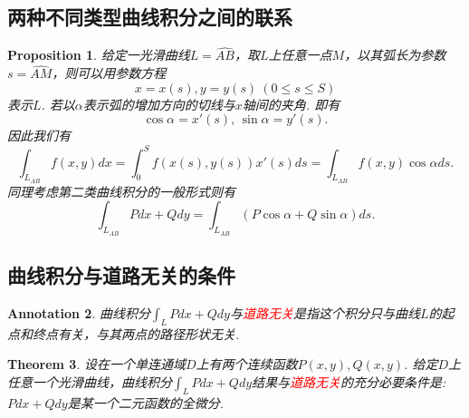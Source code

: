 \documentclass{article}
\newtheorem{theorem}{Theorem}[section]
\newtheorem{proposition}[theorem]{Proposition}
\newtheorem{annotation}[theorem]{Annotation}
\newcommand{\redt}[1]{\textcolor{red}{#1}}
\begin{document}
\subsection{两种不同类型曲线积分之间的联系}

\begin{proposition}
\rm 给定一光滑曲线$L=\widehat{AB}$，取$L$上任意一点$M$，以其弧长为参数$s=\widehat{AM}$，则可以用参数方程
$$
x=x(s),y=y(s) ~ (0 \leq s \leq S)
$$
表示$L$. 若以$\alpha$表示弧的增加方向的切线与$x$轴间的夹角. 即有
$$
\cos \alpha = x'(s), \, \sin \alpha = y'(s).
$$
因此我们有
$$
\int_{L_{AB}} f(x,y)dx = \int_0^S f(x(s),y(s))x'(s)ds = \int_{L_{AB}} f(x,y)\cos \alpha ds.
$$
同理考虑第二类曲线积分的一般形式则有
$$
\int_{L_{AB}}Pdx+Qdy = \int_{L_{AB}} (P\cos\alpha +Q\sin\alpha)ds.
$$
\end{proposition}

\newpage
\subsection{曲线积分与道路无关的条件}

\begin{annotation}
\rm 曲线积分$\int_L Pdx + Qdy$与\redt{道路无关}是指这个积分只与曲线$L$的起点和终点有关，与其两点的路径形状无关. 
\end{annotation}

\begin{theorem}\label{line-integral: path-independent}
\rm 设在一个单连通域$D$上有两个连续函数$P(x,y),Q(x,y)$. 给定$D$上任意一个光滑曲线，曲线积分$\int_L Pdx + Qdy$结果与\redt{道路无关}的充分必要条件是: $Pdx+Qdy$是某一个二元函数的全微分. 
\end{theorem}
\end{document}
